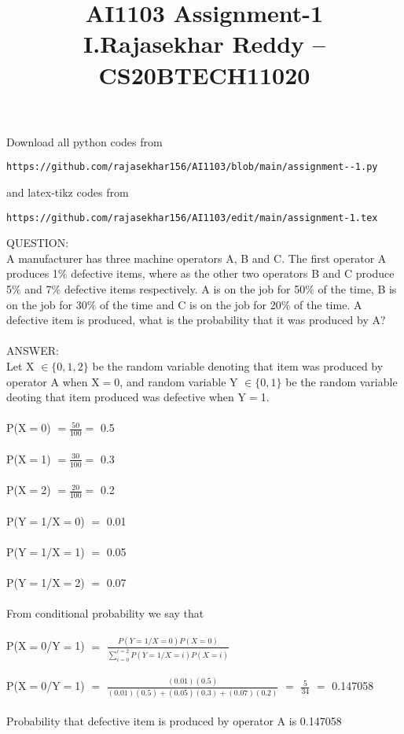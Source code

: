 \documentclass[]{article}
\title{}
\author{}
\begin{document}
\title{AI1103 Assignment-1 \\I.Rajasekhar Reddy -- CS20BTECH11020}
\maketitle
Download all python codes from 
\begin{lstlisting}
https://github.com/rajasekhar156/AI1103/blob/main/assignment--1.py
\end{lstlisting}
and latex-tikz codes from
\begin{lstlisting}
https://github.com/rajasekhar156/AI1103/edit/main/assignment-1.tex
\end{lstlisting}




QUESTION:\\
A manufacturer has three machine operators A, B and C. The first operator A produces 1$\%$ defective items, where as the other two operators B and C produce 5$\%$ and 7$\%$ defective items respectively. A is on the job
for 50$\%$ of the time, B is on the job for 30$\%$ of the time and C is on the job for 20$\%$ of the time. A defective item is produced, what
is the probability that it was produced by A$?$
\\ \\
ANSWER:\\
Let X $\in\{0,1,2\}$ be the random variable denoting that item was produced by operator A when X$=$0, and random variable Y $\in\{0,1\}$ be the random variable deoting that item produced was  defective when Y$=$1.\\ \\
	P(X$=$0) $=\frac{50}{100} =$ 0.5 \\ \\
    P(X$=$1) $=\frac{30}{100} =$ 0.3 \\ \\ 
    P(X$=$2) $=\frac{20}{100} =$ 0.2 \\ \\	
	P(Y$=$1/X$=$0) $=$ 0.01\\ \\
	P(Y$=$1/X$=$1) $=$ 0.05\\ \\
	P(Y$=$1/X$=$2) $=$ 0.07\\ \\
	From conditional probability we say that \\ \\
	P(X$=$0/Y$=$1) $=$ $\frac{P(Y=1/X=0)P(X=0)}{\sum_{i=0}^{i=2}P(Y=1/X=i)P(X=i)}$\\ \\ 
	P(X$=$0/Y$=$1) $=$ $\frac{(0.01)(0.5)}{(0.01)(0.5)+(0.05)(0.3)+(0.07)(0.2)}$ $=$ $\frac{5}{34}$ $=$ 0.147058\\ \\
	Probability that defective item is produced by operator A is 0.147058
	
\end{document}
